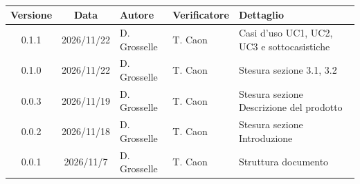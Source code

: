 \\[0.5cm]

\renewcommand{\arraystretch}{1.3}
\noindent\begin{tabularx}{\textwidth}{|c|c|>{\raggedright\arraybackslash}p{2.8cm}|>{\raggedright\arraybackslash}p{2.8cm}|X|}
    \hline
    \textbf{Versione} & \textbf{Data} & \textbf{Autore} & \textbf{Verificatore} & \textbf{Dettaglio} \\
    \hline
    0.1.1 & 2026/11/22 & D. Grosselle & T. Caon & Casi d'uso UC1, UC2, UC3 e sottocasistiche \\
    \hline
    0.1.0 & 2026/11/22 & D. Grosselle & T. Caon & Stesura sezione 3.1, 3.2  \\
    \hline
    0.0.3 & 2026/11/19 & D. Grosselle & T. Caon & Stesura sezione Descrizione del prodotto  \\
    \hline
    0.0.2 & 2026/11/18 & D. Grosselle & T. Caon & Stesura sezione Introduzione \\
    \hline
    0.0.1 & 2026/11/7 & D. Grosselle & T. Caon & Struttura documento \\
    \hline
\end{tabularx}
\newpage
